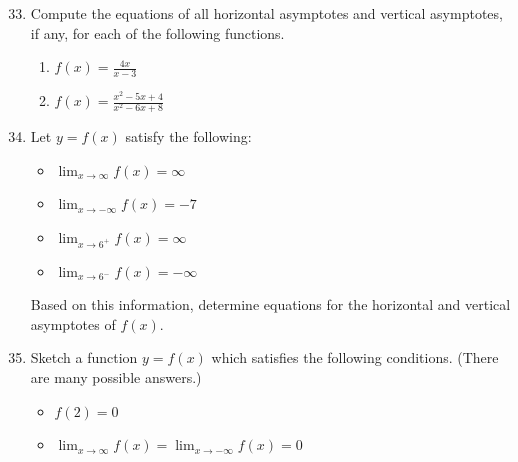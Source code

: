 \documentclass[12pt]{article}
\newif\ifans
\begin{document}
\begin{enumerate}
\setcounter{enumi}{32}

\item Compute the equations of all horizontal asymptotes and vertical asymptotes, if any, for each of the following functions.

\begin{enumerate}

\item $\displaystyle f(x)=\frac{4x}{x-3}$

\ifans{\fbox{Vertical Asymptote: $x=3$, Horizontal Asymptote: $y=4$}} \fi

\item $\displaystyle f(x)=\frac{x^2-5x+4}{x^2-6x+8}$

\ifans{\fbox{Vertical Asymptote: $x=2$, Horizontal Asymptote: $y=1$}} \fi

\end{enumerate}

\item Let $y=f(x)$ satisfy the following:

\begin{itemize}

\item $\displaystyle \lim_{x\rightarrow \infty}{f(x)}=\infty$

\item $\displaystyle \lim_{x\rightarrow -\infty}{f(x)}=-7$

\item $\displaystyle \lim_{x\rightarrow 6^+}{f(x)}=\infty$

\item $\displaystyle \lim_{x\rightarrow 6^-}{f(x)}=-\infty$

\end{itemize}

Based on this information, determine equations for the horizontal and vertical asymptotes of $f(x)$.

\ifans{\fbox{Vertical Asymptote: $x=6$; Horizontal Asymptote: $y=-7$}} \fi

\item Sketch a function $y=f(x)$ which satisfies the following conditions. (There are many possible answers.)

\begin{itemize}

\item $f(2)=0$

\item $\displaystyle \lim_{x \rightarrow \infty}{f(x)}=\lim_{x \rightarrow -\infty}{f(x)}=0$


\end{itemize}
\end{enumerate}
\end{document}
